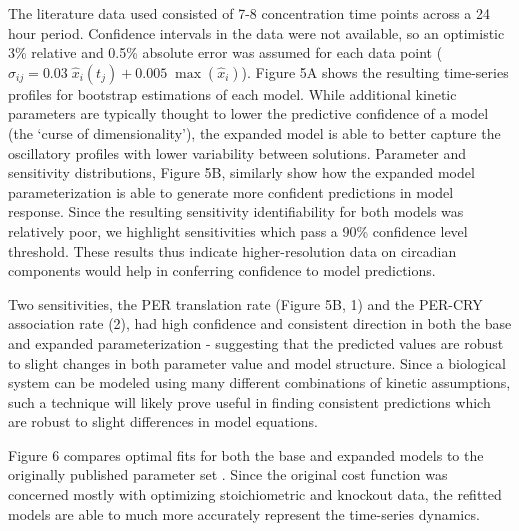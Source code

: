 The literature data used consisted of 7-8 concentration time points across a 24
hour period. Confidence intervals in the data were not available, so an
optimistic 3\% relative and 0.5\% absolute error was assumed for each data
point ($\sigma_{ij} = 0.03\;\hat{x}_{i}(t_j) + 0.005\;\max(\hat{x}_i)$). Figure
5A shows the resulting time-series profiles for bootstrap estimations of each
model. While additional kinetic parameters are typically thought to lower the
predictive confidence of a model (the `curse of dimensionality'), the expanded
model is able to better capture the oscillatory profiles with lower variability
between solutions.  Parameter and sensitivity distributions, Figure 5B,
similarly show how the expanded model parameterization is able to generate more
confident predictions in model response.  Since the resulting sensitivity
identifiability for both models was relatively poor, we highlight sensitivities
which pass a 90\% confidence level threshold. These results thus indicate
higher-resolution data on circadian components would help in conferring
confidence to model predictions.

Two sensitivities, the PER translation rate (Figure 5B, 1) and the PER-CRY
association rate (2), had high confidence and consistent direction in both the
base and expanded parameterization - suggesting that the predicted values are
robust to slight changes in both parameter value and model structure. Since a
biological system can be modeled using many different combinations of kinetic
assumptions, such a technique will likely prove useful in finding consistent
predictions which are robust to slight differences in model equations.

Figure 6 compares optimal fits for both the base and expanded models to the originally published parameter set \cite{Hirota2012}. Since the original cost function was concerned mostly with optimizing stoichiometric and knockout data, the refitted models are able to much more accurately represent the time-series dynamics. 

